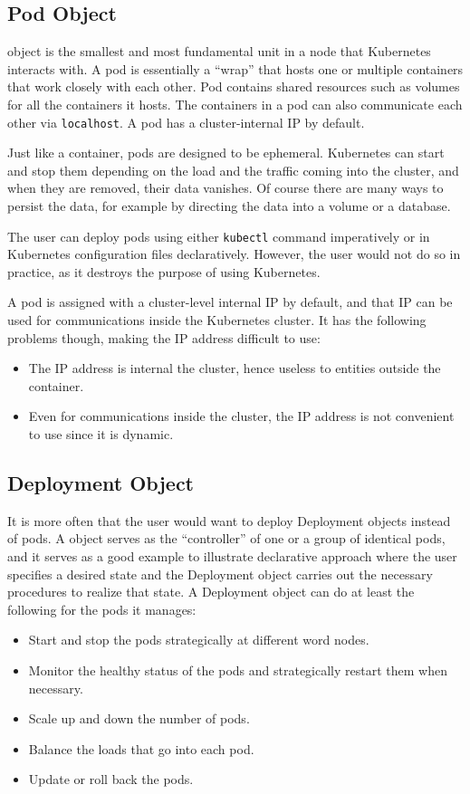 \subsection{Pod Object}

 object is the smallest and most fundamental unit in a node that Kubernetes interacts with. A pod is essentially a ``wrap'' that hosts one or multiple containers that work closely with each other. Pod contains shared resources such as volumes for all the containers it hosts. The containers in a pod can also communicate each other via \verb|localhost|. A pod has a cluster-internal IP by default.

Just like a container, pods are designed to be ephemeral. Kubernetes can start and stop them depending on the load and the traffic coming into the cluster, and when they are removed, their data vanishes. Of course there are many ways to persist the data, for example by directing the data into a volume or a database.

The user can deploy pods using either \verb|kubectl| command imperatively or in Kubernetes configuration files declaratively. However, the user would not do so in practice, as it destroys the purpose of using Kubernetes.

A pod is assigned with a cluster-level internal IP by default, and that IP can be used for communications inside the Kubernetes cluster. It has the following problems though, making the IP address difficult to use:
\begin{itemize}
  \item The IP address is internal the cluster, hence useless to entities outside the container.
  \item Even for communications inside the cluster, the IP address is not convenient to use since it is dynamic.
\end{itemize}

\subsection{Deployment Object}

It is more often that the user would want to deploy Deployment objects instead of pods. A  object serves as the ``controller'' of one or a group of identical pods, and it serves as a good example to illustrate declarative approach where the user specifies a desired state and the Deployment object carries out the necessary procedures to realize that state. A Deployment object can do at least the following for the pods it manages:
\begin{itemize}
  \item Start and stop the pods strategically at different word nodes.
  \item Monitor the healthy status of the pods and strategically restart them when necessary.
  \item Scale up and down the number of pods.
  \item Balance the loads that go into each pod.
  \item Update or roll back the pods.
\end{itemize}

